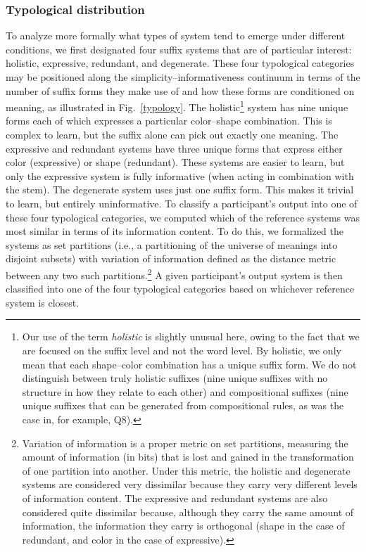 \documentclass[doc,biblatex]{apa7}
\begin{document}
\subsubsection{Typological distribution}

To analyze more formally what types of system tend to emerge under different conditions, we first designated four suffix systems that are of particular interest: holistic, expressive, redundant, and degenerate. These four typological categories may be positioned along the simplicity--informativeness continuum in terms of the number of suffix forms they make use of and how these forms are conditioned on meaning, as illustrated in Fig.~\ref{typology}. The holistic\footnote{Our use of the term \textit{holistic} is slightly unusual here, owing to the fact that we are focused on the suffix level and not the word level. By holistic, we only mean that each shape--color combination has a unique suffix form. We do not distinguish between truly holistic suffixes (nine unique suffixes with no structure in how they relate to each other) and compositional suffixes (nine unique suffixes that can be generated from compositional rules, as was the case in, for example, Q8).} system has nine unique forms each of which expresses a particular color--shape combination. This is complex to learn, but the suffix alone can pick out exactly one meaning. The expressive and redundant systems have three unique forms that express either color (expressive) or shape (redundant). These systems are easier to learn, but only the expressive system is fully informative (when acting in combination with the stem). The degenerate system uses just one suffix form. This makes it trivial to learn, but entirely uninformative. To classify a participant's output into one of these four typological categories, we computed which of the reference systems was most similar in terms of its information content. To do this, we formalized the systems as set partitions (i.e., a partitioning of the universe of meanings into disjoint subsets) with variation of information \parencite{Meila:2007} defined as the distance metric between any two such partitions.\footnote{Variation of information is a proper metric on set partitions, measuring the amount of information (in bits) that is lost and gained in the transformation of one partition into another. Under this metric, the holistic and degenerate systems are considered very dissimilar because they carry very different levels of information content. The expressive and redundant systems are also considered quite dissimilar because, although they carry the same amount of information, the information they carry is orthogonal (shape in the case of redundant, and color in the case of expressive).} A given participant's output system is then classified into one of the four typological categories based on whichever reference system is closest.
\end{document}
